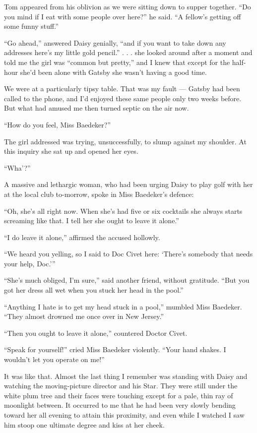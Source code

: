 \documentclass{znotebook}
\begin{document}
Tom appeared from his oblivion as we were sitting down to supper together. ``Do you mind if I eat with some people over here?'' he said. ``A fellow’s getting off some funny stuff.''

``Go ahead,'' answered Daisy genially, ``and if you want to take down any addresses here’s my little gold pencil.'' . . . she looked around after a moment and told me the girl was ``common but pretty,'' and I knew that except for the half-hour she’d been alone with Gatsby she wasn’t having a good time.

We were at a particularly tipsy table. That was my fault — Gatsby had been called to the phone, and I’d enjoyed these same people only two weeks before. But what had amused me then turned septic on the air now.

``How do you feel, Miss Baedeker?''

The girl addressed was trying, unsuccessfully, to slump against my shoulder. At this inquiry she sat up and opened her eyes.

``Wha’?''

A massive and lethargic woman, who had been urging Daisy to play golf with her at the local club to-morrow, spoke in Miss Baedeker’s defence:

``Oh, she’s all right now. When she’s had five or six cocktails she always starts screaming like that. I tell her she ought to leave it alone.''

``I do leave it alone,'' affirmed the accused hollowly.

``We heard you yelling, so I said to Doc Civet here: ‘There’s somebody that needs your help, Doc.’''

``She’s much obliged, I’m sure,'' said another friend, without gratitude. ``But you got her dress all wet when you stuck her head in the pool.''

``Anything I hate is to get my head stuck in a pool,'' mumbled Miss Baedeker. ``They almost drowned me once over in New Jersey.''

``Then you ought to leave it alone,'' countered Doctor Civet.

``Speak for yourself!'' cried Miss Baedeker violently. ``Your hand shakes. I wouldn’t let you operate on me!''

It was like that. Almost the last thing I remember was standing with Daisy and watching the moving-picture director and his Star. They were still under the white plum tree and their faces were touching except for a pale, thin ray of moonlight between. It occurred to me that he had been very slowly bending toward her all evening to attain this proximity, and even while I watched I saw him stoop one ultimate degree and kiss at her cheek.
\end{document}
